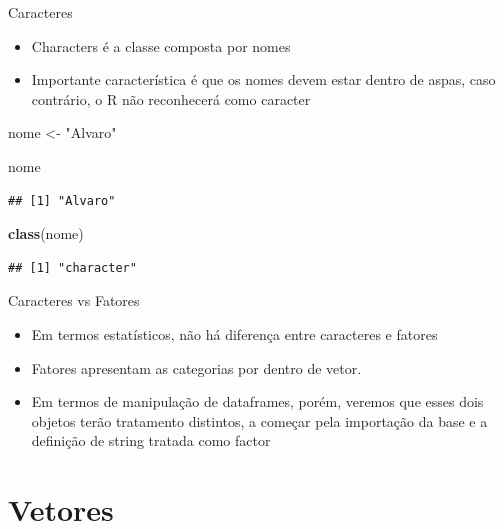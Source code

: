 \documentclass[
  10pt,
  ignorenonframetext,
]{beamer}
\newenvironment{Shaded}{\begin{snugshade}}{\end{snugshade}}
\newcommand{\KeywordTok}[1]{\textcolor[rgb]{0.13,0.29,0.53}{\textbf{#1}}}
\newcommand{\NormalTok}[1]{#1}
\newcommand{\StringTok}[1]{\textcolor[rgb]{0.31,0.60,0.02}{#1}}
\providecommand{\tightlist}{%
  \setlength{\itemsep}{0pt}\setlength{\parskip}{0pt}}
\begin{document}
\begin{frame}[fragile]{Caracteres}
\protect\hypertarget{caracteres}{}
\begin{itemize}
\item
  Characters é a classe composta por nomes
\item
  Importante característica é que os nomes devem estar dentro de aspas,
  caso contrário, o R não reconhecerá como caracter
\end{itemize}

\begin{Shaded}
\begin{Highlighting}[]
\NormalTok{nome \textless{}{-}}\StringTok{ "Alvaro"}

\NormalTok{nome}
\end{Highlighting}
\end{Shaded}

\begin{verbatim}
## [1] "Alvaro"
\end{verbatim}

\begin{Shaded}
\begin{Highlighting}[]
\KeywordTok{class}\NormalTok{(nome)}
\end{Highlighting}
\end{Shaded}

\begin{verbatim}
## [1] "character"
\end{verbatim}
\end{frame}

\begin{frame}{Caracteres vs Fatores}
\protect\hypertarget{caracteres-vs-fatores}{}
\begin{itemize}
\tightlist
\item
  Em termos estatísticos, não há diferença entre caracteres e fatores
\item
  Fatores apresentam as categorias por dentro de vetor.
\item
  Em termos de manipulação de dataframes, porém, veremos que esses dois
  objetos terão tratamento distintos, a começar pela importação da base
  e a definição de string tratada como factor
\end{itemize}
\end{frame}

\hypertarget{vetores}{%
\section{Vetores}\label{vetores}}
\end{document}
